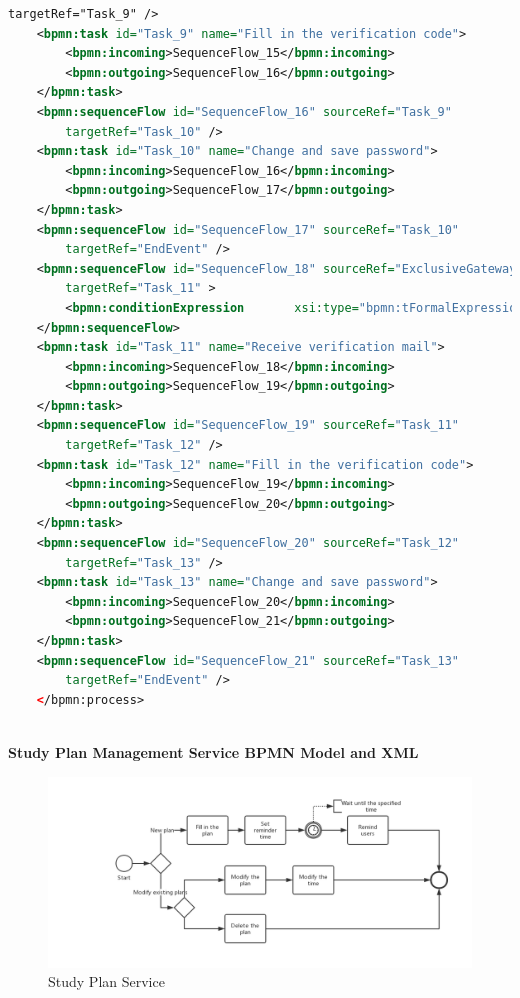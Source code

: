 \documentclass[runningheads]{llncs}
\begin{document}
\begin{lstlisting}[language={XML}]
		targetRef="Task_9" />
	<bpmn:task id="Task_9" name="Fill in the verification code">
		<bpmn:incoming>SequenceFlow_15</bpmn:incoming>
		<bpmn:outgoing>SequenceFlow_16</bpmn:outgoing>
	</bpmn:task>
	<bpmn:sequenceFlow id="SequenceFlow_16" sourceRef="Task_9"
		targetRef="Task_10" />
	<bpmn:task id="Task_10" name="Change and save password">
		<bpmn:incoming>SequenceFlow_16</bpmn:incoming>
		<bpmn:outgoing>SequenceFlow_17</bpmn:outgoing>
	</bpmn:task>
	<bpmn:sequenceFlow id="SequenceFlow_17" sourceRef="Task_10"
		targetRef="EndEvent" />
	<bpmn:sequenceFlow id="SequenceFlow_18" sourceRef="ExclusiveGateway_3"
		targetRef="Task_11" >
		<bpmn:conditionExpression       xsi:type="bpmn:tFormalExpression">Mail</bpmn:conditionExpression>
	</bpmn:sequenceFlow>
	<bpmn:task id="Task_11" name="Receive verification mail">
		<bpmn:incoming>SequenceFlow_18</bpmn:incoming>
		<bpmn:outgoing>SequenceFlow_19</bpmn:outgoing>
	</bpmn:task>
	<bpmn:sequenceFlow id="SequenceFlow_19" sourceRef="Task_11"
		targetRef="Task_12" />
	<bpmn:task id="Task_12" name="Fill in the verification code">
		<bpmn:incoming>SequenceFlow_19</bpmn:incoming>
		<bpmn:outgoing>SequenceFlow_20</bpmn:outgoing>
	</bpmn:task>
	<bpmn:sequenceFlow id="SequenceFlow_20" sourceRef="Task_12"
		targetRef="Task_13" />
	<bpmn:task id="Task_13" name="Change and save password">
		<bpmn:incoming>SequenceFlow_20</bpmn:incoming>
		<bpmn:outgoing>SequenceFlow_21</bpmn:outgoing>
	</bpmn:task>
	<bpmn:sequenceFlow id="SequenceFlow_21" sourceRef="Task_13"
		targetRef="EndEvent" />
	</bpmn:process>
    
	\end{lstlisting}



    \clearpage
    \textbf{Study Plan Management Service BPMN Model and XML}\\
   \begin{figure}
       \centering %
      \includegraphics[width=1.0\textwidth]{figure/hyy/studyplanmanagement} %
       \caption{Study Plan Service} %
   \end{figure}
\end{document}
